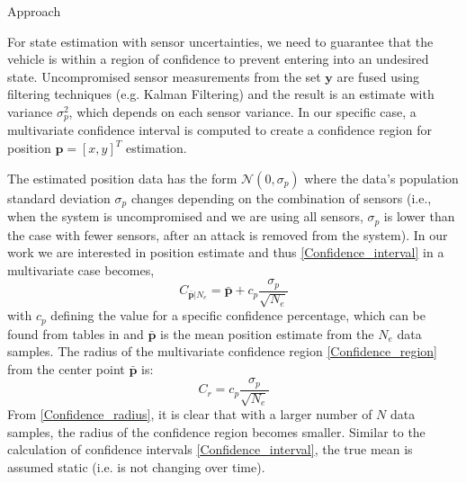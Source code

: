\begin{section}{Approach}
	
For state estimation with sensor uncertainties, we need to guarantee that the vehicle is within a region of confidence to prevent entering into an undesired state. Uncompromised sensor measurements from the set $\bm{y}$ are fused using filtering techniques (e.g. Kalman Filtering) and the result is an estimate with variance $\sigma_p^2$, which depends on each sensor variance. In our specific case, a multivariate confidence interval is computed to create a confidence region for position $\bm{p}=[x,y]^T$ estimation. 


The estimated position data has the form $\mathcal{N}(0,\sigma_p)$ where the data's population standard deviation $\sigma_p$ changes depending on the combination of sensors (i.e., when the system is uncompromised and we are using all sensors, $\sigma_p$ is lower than the case with fewer sensors, after an attack is removed from the system). In our work we are interested in position estimate and thus \eqref{Confidence_interval} in a multivariate case becomes,
    \begin{equation}
    \label{Confidence_region}
		C_{\bar{\bm{p}}|N_e} = \bar{\bm{p}} + c_p\frac{\sigma_p}{\sqrt{N_e}}
	\end{equation}
with $c_p$ defining the value for a specific confidence percentage, which can be found from tables in \cite{devore2011probability} and $\bar{\bm{p}}$ is the mean position estimate from the $N_e$ data samples. The radius of the multivariate confidence region \eqref{Confidence_region} from the center point $\bar{\bm{p}}$ is:
    \begin{equation}
    \label{Confidence_radius}
		C_r = c_p\frac{\sigma_p}{\sqrt{N_e}}
	\end{equation}
From \eqref{Confidence_radius}, it is clear that with a larger number of $N$ data samples, the radius of the confidence region becomes smaller. Similar to the calculation of confidence intervals \eqref{Confidence_interval}, the true mean is assumed static (i.e. is not changing over time). 




\end{section}
